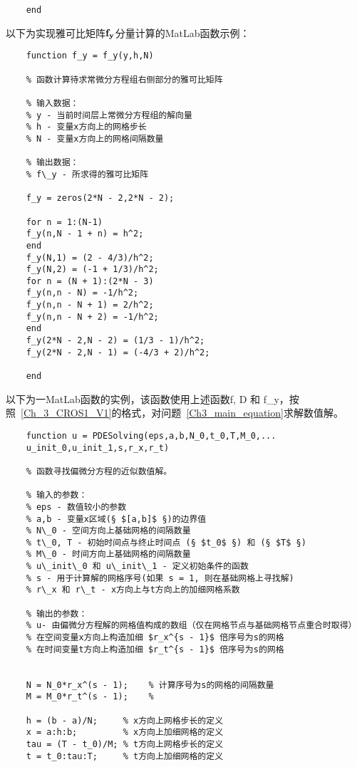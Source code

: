 \documentclass[twoside]{book}
\def\textbf{\bf}%
\begin{document}
\begin{CJK*}{GBK}{song}
\begin{lstlisting}
	end
	\end{lstlisting}

	以下为实现雅可比矩阵$\emph{\textbf{f}}_\emph{\textbf{y}}$分量计算的MatLab函数示例：
	\begin{lstlisting}
	function f_y = f_y(y,h,N)
	
	% 函数计算待求常微分方程组右侧部分的雅可比矩阵
	
	% 输入数据：
	% y - 当前时间层上常微分方程组的解向量
	% h - 变量x方向上的网格步长
	% N - 变量x方向上的网格间隔数量
	
	% 输出数据：
	% f\_y - 所求得的雅可比矩阵
	
	f_y = zeros(2*N - 2,2*N - 2);
	
	for n = 1:(N-1)
	f_y(n,N - 1 + n) = h^2;
	end
	f_y(N,1) = (2 - 4/3)/h^2;
	f_y(N,2) = (-1 + 1/3)/h^2;
	for n = (N + 1):(2*N - 3)
	f_y(n,n - N) = -1/h^2;
	f_y(n,n - N + 1) = 2/h^2;
	f_y(n,n - N + 2) = -1/h^2;
	end
	f_y(2*N - 2,N - 2) = (1/3 - 1)/h^2;
	f_y(2*N - 2,N - 1) = (-4/3 + 2)/h^2;
	
	end
	\end{lstlisting}


	以下为一MatLab函数的实例，该函数使用上述函数f, D 和 f\_y，按照~\eqref{Ch_3_CROS1_V1}的格式，对问题~\eqref{Ch3_main_equation}求解数值解。
	\begin{lstlisting}
	function u = PDESolving(eps,a,b,N_0,t_0,T,M_0,...
	u_init_0,u_init_1,s,r_x,r_t)
	
	% 函数寻找偏微分方程的近似数值解。
	
	% 输入的参数：
	% eps - 数值较小的参数
	% a,b - 变量x区域(§ $[a,b]$ §)的边界值
	% N\_0 - 空间方向上基础网格的间隔数量
	% t\_0, T - 初始时间点与终止时间点 (§ $t_0$ §) 和 (§ $T$ §)
	% M\_0 - 时间方向上基础网格的间隔数量
	% u\_init\_0 和 u\_init\_1 - 定义初始条件的函数
	% s - 用于计算解的网格序号(如果 s = 1, 则在基础网格上寻找解)
	% r\_x 和 r\_t - x方向上与t方向上的加细网格系数
	
	% 输出的参数：
	% u- 由偏微分方程解的网格值构成的数组（仅在网格节点与基础网格节点重合时取得）
	% 在空间变量x方向上构造加细 $r_x^{s - 1}$ 倍序号为s的网格
	% 在时间变量t方向上构造加细 $r_t^{s - 1}$ 倍序号为s的网格
	
	
	N = N_0*r_x^(s - 1);    % 计算序号为s的网格的间隔数量
	M = M_0*r_t^(s - 1);    %
	
	h = (b - a)/N;     % x方向上网格步长的定义
	x = a:h:b;         % x方向上加细网格的定义
	tau = (T - t_0)/M; % t方向上网格步长的定义
	t = t_0:tau:T;     % t方向上加细网格的定义
	

\end{lstlisting}
\end{CJK*}
\end{document}
